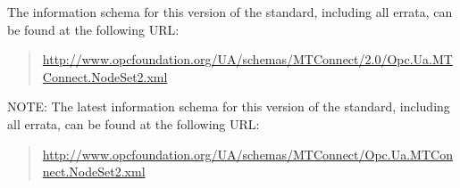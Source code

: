 The information schema for this version of the standard, including all errata, can be found at the following URL:%
\begin{quote}
  \footnotesize{\url{http://www.opcfoundation.org/UA/schemas/MTConnect/2.0/Opc.Ua.MTConnect.NodeSet2.xml}}
\end{quote}

NOTE:  The latest information schema for this version of the standard, including all errata, can be found at the following URL:%
\begin{quote}
  \footnotesize{\url{http://www.opcfoundation.org/UA/schemas/MTConnect/Opc.Ua.MTConnect.NodeSet2.xml}}
\end{quote}




